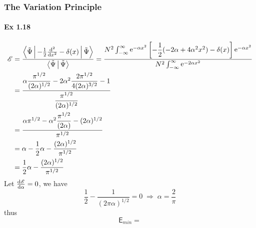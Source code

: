 \documentclass[a4paper]{article}
\DeclareMathOperator{\intdinf}{\int_{-\infty}^\infty}
\DeclareMathOperator{\e}{\mathrm{e}}
\DeclareMathOperator{\dra}{\Rightarrow}
\newcommand{\ex}[1]{\paragraph{Ex #1}}
\numberwithin{equation}{subsection}
\begin{document}
\subsubsection{The Variation Principle}
\ex{1.18}
\begin{equation}\label{key}
\begin{aligned}
\mathscr{E} &= \dfrac{\Braket{\tilde{\Psi} | -\tfrac{1}{2}\dv[2]{x}-\delta(x) | \tilde{\Psi}}}{\Braket{\tilde{\Psi} | \tilde{\Psi}}} = \dfrac{N^2 \intdinf \e^{-\alpha x^2}\qty[-\dfrac{1}{2}(-2\alpha+4\alpha^2 x^2) - \delta(x)]\e^{-\alpha x^2}}{N^2\intdinf \e^{-2\alpha x^2}}\\
&= \dfrac{\alpha\dfrac{\pi^{1/2}}{(2\alpha)^{1/2}} - 2\alpha^2\dfrac{2\pi^{1/2}}{4(2\alpha)^{3/2}} - 1}{\dfrac{\pi^{1/2}}{(2\alpha)^{1/2}}}\\
&= \dfrac{\alpha \pi^{1/2} - \alpha^2\dfrac{\pi^{1/2}}{(2\alpha)} - (2\alpha)^{1/2}}{\pi^{1/2}}\\
&= \alpha - \dfrac{1}{2}\alpha - \dfrac{(2\alpha)^{1/2}}{\pi^{1/2}}\\
&= \dfrac{1}{2}\alpha - \dfrac{(2\alpha)^{1/2}}{\pi^{1/2}}
\end{aligned}
\end{equation}
Let $ \dv{\mathscr{E}}{\alpha} = 0 $, we have
\begin{equation}\label{key}
\dfrac{1}{2} - \dfrac{1}{(2\pi\alpha)^{1/2}} = 0 \;\dra\; \alpha = \dfrac{2}{\pi}
\end{equation}
thus
\begin{equation}\label{key}
\mathsf{E}_{min} = 
\end{equation}
\end{document}

